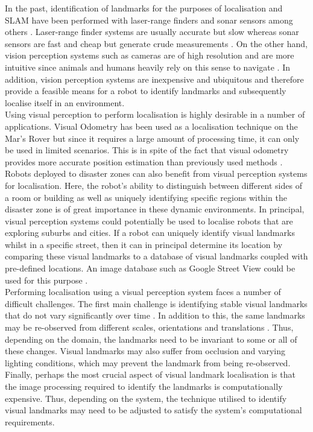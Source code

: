 \documentclass[11pt]{report}
\begin{document}
In the past, identification of landmarks for the purposes of localisation and SLAM have been performed with laser-range finders and sonar sensors among others \cite{Davison2007}. Laser-range finder systems are usually accurate but slow whereas sonar sensors are fast and cheap but generate crude measurements \cite{Se2002}. On the other hand, vision perception systems such as cameras are of high resolution and are more intuitive since animals and humans heavily rely on this sense to navigate \cite{Davison2007}. In addition, vision perception systems are inexpensive and ubiquitous and therefore provide a feasible means for a robot to identify landmarks and subsequently localise itself in an environment.\\

Using visual perception to perform localisation is highly desirable in a number of applications. Visual Odometry has been used as a localisation technique on the Mar's Rover \cite{Di2008} but since it requires a large amount of processing time, it can only be used in limited scenarios. This is in spite of the fact that visual odometry provides more accurate position estimation than previously used methods \cite{Powell2006}. Robots deployed to disaster zones can also benefit from visual perception systems for localisation. Here, the robot's ability to distinguish between different sides of a room or building as well as uniquely identifying specific regions within the disaster zone is of great importance in these dynamic environments. In principal, visual perception systems could potentially be used to localise robots that are exploring suburbs and cities. If a robot can uniquely identify visual landmarks whilst in a specific street, then it can in principal determine its location by comparing these visual landmarks to a database of visual landmarks coupled with pre-defined locations. An image database such as Google Street View could be used for this purpose \cite{StreetView}.\\

Performing localisation using a visual perception system faces a number of difficult challenges. The first main challenge is identifying stable visual landmarks that do not vary significantly over time \cite{Davison2007, Se2002}. In addition to this, the same landmarks may be re-observed from different scales, orientations and translations \cite{Szeliski2010}. Thus, depending on the domain, the landmarks need to be invariant to some or all of these changes. Visual landmarks may also suffer from occlusion and varying lighting conditions, which may prevent the landmark from being re-observed. Finally, perhaps the most crucial aspect of visual landmark localisation is that the image processing required to identify the landmarks is computationally expensive. Thus, depending on the system, the technique utilised to identify visual landmarks may need to be adjusted to satisfy the system's computational requirements. \\
\end{document}
